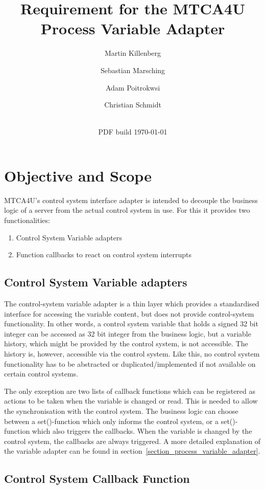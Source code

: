 \documentclass[11pt,a4paper]{scrartcl}
\title{Requirement for the MTCA4U Process Variable Adapter}
\date{\svnrevision\\ PDF build \today}
\author[1]{Martin Killenberg} \author[2]{Sebastian Marsching}
\author[3]{Adam Poitrokwsi}
\author[1]{Christian Schmidt}
\affil[1]{Deutsches Elektronen-Synchrotron DESY, Hamburg, Germany}
\affil[2]{aquenos GmbH, Baden-Baden, Germany}
\affil[3]{FastLogic Sp.\ z o.\ o., \L\'od\'z, Poland}
\begin{document}
\maketitle
\section{Objective and Scope}

MTCA4U's control system interface adapter is intended to decouple the business
logic of a server from the actual control system in use. For this it provides
two functionalities: 
\begin{enumerate}
  \item Control System Variable adapters
  \item Function callbacks to react on control system interrupts
\end{enumerate}

\subsection{Control System Variable adapters}

The control-system variable adapter is a thin layer which provides a
standardised interface for accessing the variable content, but does not provide
control-system functionality. In other words, a control system variable that
holds a signed 32 bit integer can be accessed as 32 bit integer from the
business logic, but a variable history, which might be provided by the control
system, is not accessible. The history is, however, accessible via the control
system. Like this, no control system functionality has to be abstracted or
duplicated/implemented if not available on certain control systems. 

The only exception are two lists of callback functions which can be registered as
actions to be taken when the variable is changed or read. This is needed to allow the
synchronisation with the control system. The business logic can choose between
a set()-function which only informs the control system, or a set()-function
which also triggers the callbacks. When the variable is changed by the control
system, the callbacks are always triggered. A more detailed explanation of the
variable adapter can be found in
section~\ref{section_process_variable_adapter}. 

\subsection{Control System Callback Function}
\end{document}
